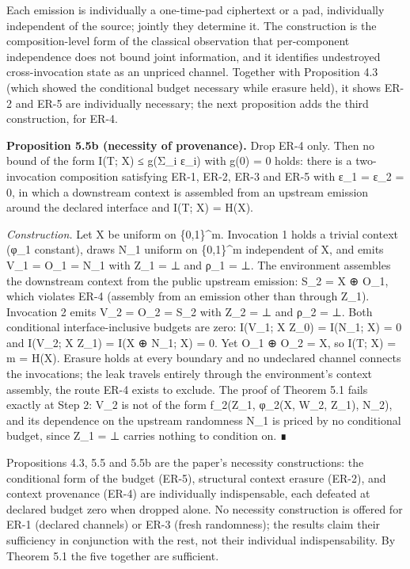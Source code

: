 \documentclass[
  11pt,
]{article}
\begin{document}
Each emission is individually a one-time-pad ciphertext or a pad,
individually independent of the source; jointly they determine it. The
construction is the composition-level form of the classical observation
that per-component independence does not bound joint information, and it
identifies undestroyed cross-invocation state as an unpriced channel.
Together with Proposition 4.3 (which showed the conditional budget
necessary while erasure held), it shows ER-2 and ER-5 are individually
necessary; the next proposition adds the third construction, for ER-4.

\textbf{Proposition 5.5b (necessity of provenance).} Drop ER-4 only.
Then no bound of the form I(T; X) ≤ g(Σ\_i ε\_i) with g(0) = 0 holds:
there is a two-invocation composition satisfying ER-1, ER-2, ER-3 and
ER-5 with ε\_1 = ε\_2 = 0, in which a downstream context is assembled
from an upstream emission around the declared interface and I(T; X) =
H(X).

\emph{Construction.} Let X be uniform on \{0,1\}\^{}m. Invocation 1
holds a trivial context (φ\_1 constant), draws N\_1 uniform on
\{0,1\}\^{}m independent of X, and emits V\_1 = O\_1 = N\_1 with Z\_1 =
⊥ and ρ\_1 = ⊥. The environment assembles the downstream context from
the public upstream emission: S\_2 = X ⊕ O\_1, which violates ER-4
(assembly from an emission other than through Z\_1). Invocation 2 emits
V\_2 = O\_2 = S\_2 with Z\_2 = ⊥ and ρ\_2 = ⊥. Both conditional
interface-inclusive budgets are zero: I(V\_1; X \textbar{} Z\_0) =
I(N\_1; X) = 0 and I(V\_2; X \textbar{} Z\_1) = I(X ⊕ N\_1; X) = 0. Yet
O\_1 ⊕ O\_2 = X, so I(T; X) = m = H(X). Erasure holds at every boundary
and no undeclared channel connects the invocations; the leak travels
entirely through the environment's context assembly, the route ER-4
exists to exclude. The proof of Theorem 5.1 fails exactly at Step 2:
V\_2 is not of the form f\_2(Z\_1, φ\_2(X, W\_2, Z\_1), N\_2), and its
dependence on the upstream randomness N\_1 is priced by no conditional
budget, since Z\_1 = ⊥ carries nothing to condition on. ∎

Propositions 4.3, 5.5 and 5.5b are the paper's necessity constructions:
the conditional form of the budget (ER-5), structural context erasure
(ER-2), and context provenance (ER-4) are individually indispensable,
each defeated at declared budget zero when dropped alone. No necessity
construction is offered for ER-1 (declared channels) or ER-3 (fresh
randomness); the results claim their sufficiency in conjunction with the
rest, not their individual indispensability. By Theorem 5.1 the five
together are sufficient.
\end{document}
